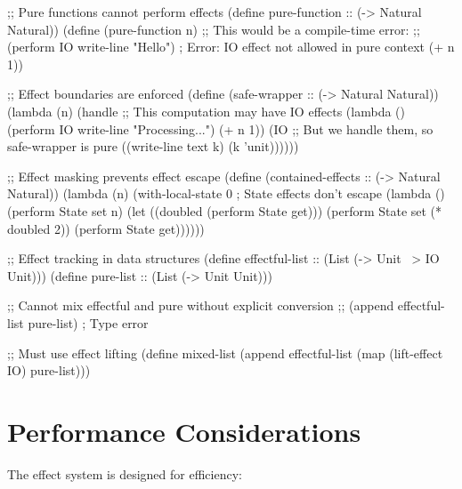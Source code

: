 \begin{example}
\begin{lambdustcode}
;; Pure functions cannot perform effects
(define pure-function :: (-> Natural Natural))
(define (pure-function n)
  ;; This would be a compile-time error:
  ;; (perform IO write-line "Hello")  ; Error: IO effect not allowed in pure context
  (+ n 1))

;; Effect boundaries are enforced
(define (safe-wrapper :: (-> Natural Natural))
  (lambda (n)
    (handle 
      ;; This computation may have IO effects
      (lambda () 
        (perform IO write-line "Processing...")
        (+ n 1))
      (IO
        ;; But we handle them, so safe-wrapper is pure
        ((write-line text k) (k 'unit))))))

;; Effect masking prevents effect escape
(define (contained-effects :: (-> Natural Natural))
  (lambda (n)
    (with-local-state 0    ; State effects don't escape
      (lambda ()
        (perform State set n)
        (let ((doubled (perform State get)))
          (perform State set (* doubled 2))
          (perform State get))))))

;; Effect tracking in data structures  
(define effectful-list :: (List (-> Unit ~> {IO} Unit)))
(define pure-list :: (List (-> Unit Unit)))

;; Cannot mix effectful and pure without explicit conversion
;; (append effectful-list pure-list)  ; Type error

;; Must use effect lifting
(define mixed-list 
  (append effectful-list 
          (map (lift-effect {} {IO}) pure-list)))
\end{lambdustcode}
\end{example}

\section{Performance Considerations}
\label{sec:performance-considerations}


The effect system is designed for efficiency:

